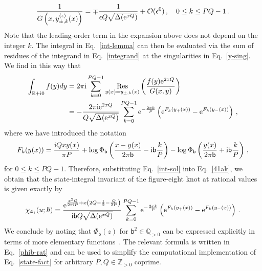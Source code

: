 \documentclass[a4paper,11pt]{article}
\theoremstyle{definition}
\newcommand{\CO}{{\cal O}}
\def\IZ{{\mathbb Z}}
\def\IR{{\mathbb R}}
\def\IQ{{\mathbb Q}}
\def\FE{\bm{4}_1}
\def\e{\epsilon}
\newcommand{\re}{{\rm e}}
\newcommand{\ri}{{\rm i}}
\newcommand{\mb}{{\mathsf{b}}}
\newcommand{\be}{\begin{equation}}
\newcommand{\ee}{\end{equation}}
\newcommand{\ba}{\begin{aligned}}
\newcommand{\ea}{\end{aligned}}
\begin{document}
\be
\frac{1}{G\left( x, y_{\pm, k}^{(\e)}(x) \right)} = \mp \frac{1}{\e Q \sqrt{\Delta(\re^{x Q})}} + \CO (\e^0) \, , \quad 0 \le k \le P Q -1 \, .
\ee
Note that the leading-order term in the expansion above does not depend on the integer $k$. The integral in Eq.~\eqref{int-lemma} can then be evaluated via the sum of residues of the integrand in Eq.~\eqref{integrand} at the singularities in Eq.~\eqref{y-sing}. We find in this way that
\be \label{int-sol}
\ba
\int_{\IR + \ri 0} f(y) dy &= 2 \pi \ri \sum_{k=0}^{P Q - 1} \underset{y(x) = y_{\pm, k}(x)}{\text{Res}} \left( \frac{f(y) \re^{2 x Q}}{G(x,y)} \right)  \\
&= - \frac{2 \pi \ri \re^{2 x Q} }{Q \sqrt{\Delta(\re^{x Q})}} \sum_{k=0}^{P Q - 1}  \re^{-\frac{2 x k}{P}} \left( \re^{F_k(y_+(x))} - \re^{F_k(y_-(x))} \right) \, ,
\ea
\ee
where we have introduced the notation
\be \label{Fk}
F_k(y(x)) = \frac{\ri Q x y(x)}{\pi P} + \log \Phi_{\mb}\left( \frac{x - y(x)}{2 \pi \mb} - \ri \mb \frac{k}{P} \right) - \log \Phi_{\mb}\left( \frac{y(x)}{2 \pi \mb} + \ri \mb \frac{k}{P} \right) \, ,
\ee
for $0 \le k \le P Q -1$. Therefore, substituting Eq.~\eqref{int-sol} into Eq.~\eqref{41ak}, we obtain that the state-integral invariant of the figure-eight knot at rational values is given exactly by
\be \label{state-fact}
\chi_{\FE}(u;\hbar) = \frac{\re^{\frac{x^2 Q}{2 \pi \ri P}+x\left( 2 Q -\frac{1}{2}-\frac{Q}{2 P}\right)} }{\ri \mb Q \sqrt{\Delta(\re^{x Q})}} \sum_{k=0}^{P Q - 1}  \re^{-\frac{2 x k}{P}} \left( \re^{F_k(y_+(x))} - \re^{F_k(y_-(x))} \right) \, .
\ee
We conclude by noting that $\Phi_{\mb}(z)$ for $\mb^2 \in \IQ_{>0}$ can be expressed explicitly in terms of more elementary functions~\cite{garou-kas}. The relevant formula is written in Eq.~\eqref{phib-rat} and can be used to simplify the computational implementation of Eq.~\eqref{state-fact} for arbitrary $P, Q \in \IZ_{>0}$ coprime. 
\end{document}
